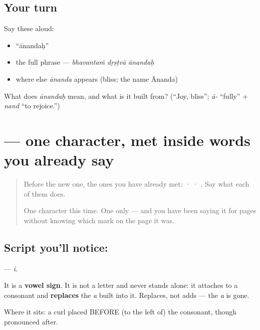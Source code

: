 \subsection*{Your turn}
Say these aloud:

\begin{itemize}
\raggedright
  \item \textquotedblleft{}ānandaḥ\textquotedblright{}
  \item the full phrase — \emph{bhavantaṁ dṛṣṭvā ānandaḥ}
  \item where else \emph{ānanda} appears (bliss; the name Ānanda)
\end{itemize}

\begin{tcolorbox}[breakable,colback=teal!4,colframe=teal!35!black,title={Before you move on}]
What does \emph{ānandaḥ} mean, and what is it built from? (\textquotedblleft{}Joy, bliss\textquotedblright{}; \emph{ā-} \textquotedblleft{}fully\textquotedblright{} + \emph{nand} \textquotedblleft{}to rejoice.\textquotedblright{})
\end{tcolorbox}
\section[\texorpdfstring{\sk{ि} (i)}{ि (i)}]{ — one character, met inside words you already say}

\label{lesson:SA-S109-vowel-sign-i}



\begin{quote}
Before the new one, the ones you have already met:  ·  · . Say what each of them does.

One character this time. One only — and you have been saying it for pages without knowing which mark on the page it was.
\end{quote}

\subsection*{Script you'll notice: }
\textbf{} — \emph{i}.

It is a \textbf{vowel sign}. It is not a letter and never stands alone: it attaches to a consonant and \textbf{replaces} the \emph{a} built into it. Replaces, not adds — the \emph{a} is gone.

Where it sits: a curl placed BEFORE (to the left of) the consonant, though pronounced after.

